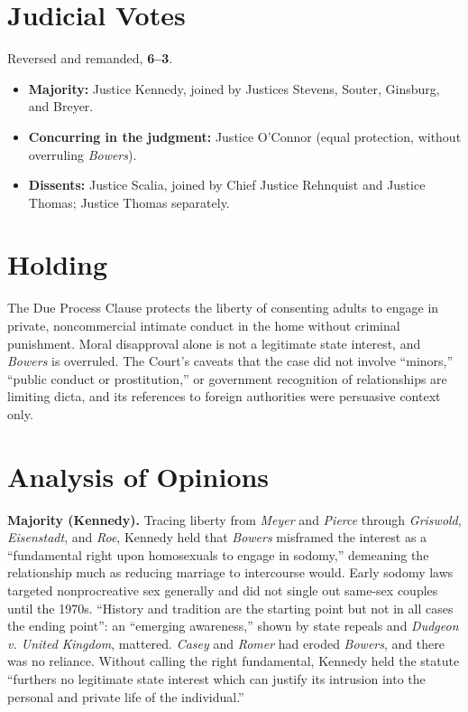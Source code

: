 \documentclass[12pt]{article}
\begin{document}
\section{Judicial Votes}

Reversed and remanded, \textbf{6--3}.
\begin{itemize}
\item \textbf{Majority:} Justice Kennedy, joined by Justices Stevens, Souter, Ginsburg, and Breyer.
\item \textbf{Concurring in the judgment:} Justice O'Connor (equal protection, without overruling \textit{Bowers}).
\item \textbf{Dissents:} Justice Scalia, joined by Chief Justice Rehnquist and Justice Thomas; Justice Thomas separately.
\end{itemize}

\section{Holding}

The Due Process Clause protects the liberty of consenting adults to engage in private, noncommercial intimate conduct in the home without criminal punishment. Moral disapproval alone is not a legitimate state interest, and \textit{Bowers} is overruled. The Court's caveats that the case did not involve ``minors,'' ``public conduct or prostitution,'' or government recognition of relationships are limiting dicta, and its references to foreign authorities were persuasive context only.

\section{Analysis of Opinions}

\textbf{Majority (Kennedy).} Tracing liberty from \textit{Meyer} and \textit{Pierce} through \textit{Griswold}, \textit{Eisenstadt}, and \textit{Roe}, Kennedy held that \textit{Bowers} misframed the interest as a ``fundamental right upon homosexuals to engage in sodomy,'' demeaning the relationship much as reducing marriage to intercourse would. Early sodomy laws targeted nonprocreative sex generally and did not single out same-sex couples until the 1970s. ``History and tradition are the starting point but not in all cases the ending point'': an ``emerging awareness,'' shown by state repeals and \textit{Dudgeon v. United Kingdom}, mattered. \textit{Casey} and \textit{Romer} had eroded \textit{Bowers}, and there was no reliance. Without calling the right fundamental, Kennedy held the statute ``furthers no legitimate state interest which can justify its intrusion into the personal and private life of the individual.''
\end{document}
